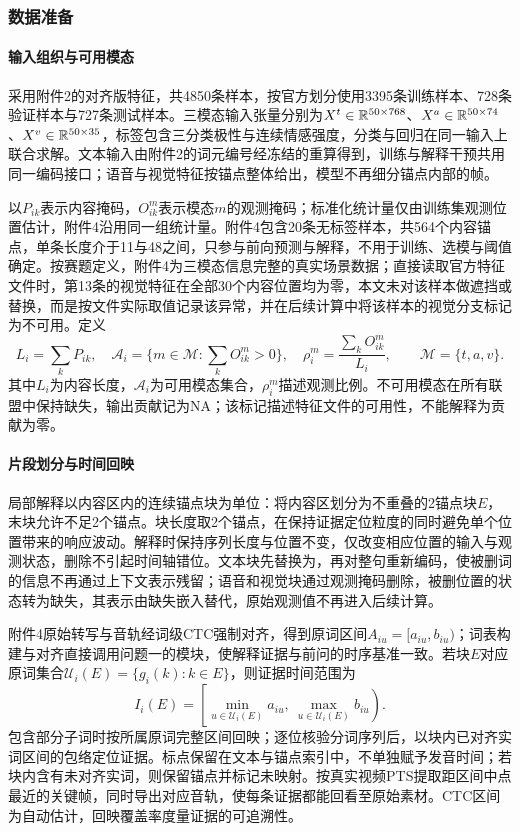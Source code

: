 \subsubsection{数据准备}
\FloatBarrier
\paragraph{输入组织与可用模态}
采用附件2的对齐版特征，共4850条样本，按官方划分使用3395条训练样本、728条验证样本与727条测试样本。三模态输入张量分别为$X^t\in\mathbb R^{50\times768}$、$X^a\in\mathbb R^{50\times74}$、$X^v\in\mathbb R^{50\times35}$，标签包含三分类极性与连续情感强度，分类与回归在同一输入上联合求解。文本输入由附件2的词元编号经冻结的重算得到，训练与解释干预共用同一编码接口；语音与视觉特征按锚点整体给出，模型不再细分锚点内部的帧。

以$P_{ik}$表示内容掩码，$O^m_{ik}$表示模态$m$的观测掩码；标准化统计量仅由训练集观测位置估计，附件4沿用同一组统计量。附件4包含20条无标签样本，共564个内容锚点，单条长度介于11与48之间，只参与前向预测与解释，不用于训练、选模与阈值确定。按赛题定义，附件4为三模态信息完整的真实场景数据；直接读取官方特征文件时，第13条的视觉特征在全部30个内容位置均为零，本文未对该样本做遮挡或替换，而是按文件实际取值记录该异常，并在后续计算中将该样本的视觉分支标记为不可用。定义
\begin{equation}
L_i=\sum_kP_{ik},\quad \mathcal A_i=\{m\in\mathcal M:\sum_kO^m_{ik}>0\},\quad
\rho_i^m=\frac{\sum_kO^m_{ik}}{L_i},\qquad\mathcal M=\{t,a,v\}.
\end{equation}
其中$L_i$为内容长度，$\mathcal A_i$为可用模态集合，$\rho_i^m$描述观测比例。不可用模态在所有联盟中保持缺失，输出贡献记为NA；该标记描述特征文件的可用性，不能解释为贡献为零。

\FloatBarrier
\paragraph{片段划分与时间回映}
局部解释以内容区内的连续锚点块为单位：将内容区划分为不重叠的2锚点块$E$，末块允许不足2个锚点。块长度取2个锚点，在保持证据定位粒度的同时避免单个位置带来的响应波动。解释时保持序列长度与位置不变，仅改变相应位置的输入与观测状态，删除不引起时间轴错位。文本块先替换为\file{[UNK]}，再对整句重新编码，使被删词的信息不再通过上下文表示残留；语音和视觉块通过观测掩码删除，被删位置的状态转为缺失，其表示由缺失嵌入替代，原始观测值不再进入后续计算。

附件4原始转写与音轨经词级CTC强制对齐，得到原词区间$A_{iu}=[a_{iu},b_{iu})$；词表构建与对齐直接调用问题一的模块，使解释证据与前问的时序基准一致。若块$E$对应原词集合$\mathcal U_i(E)=\{g_i(k):k\in E\}$，则证据时间范围为
\begin{equation}
I_i(E)=\left[\min_{u\in\mathcal U_i(E)}a_{iu},\ \max_{u\in\mathcal U_i(E)}b_{iu}\right).
\end{equation}
包含部分子词时按所属原词完整区间回映；逐位核验分词序列后，以块内已对齐实词区间的包络定位证据。标点保留在文本与锚点索引中，不单独赋予发音时间；若块内含有未对齐实词，则保留锚点并标记未映射。按真实视频PTS提取距区间中点最近的关键帧，同时导出对应音轨，使每条证据都能回看至原始素材。CTC区间为自动估计，回映覆盖率度量证据的可追溯性。

